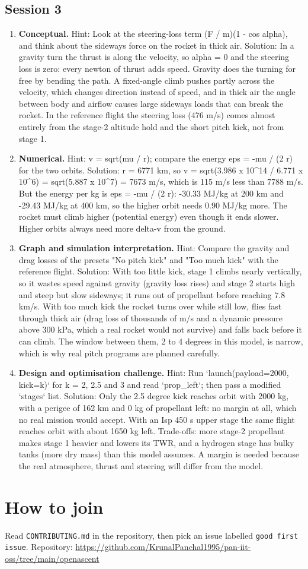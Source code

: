 \documentclass[11pt,a4paper]{article}
\begin{document}
\subsection*{Session 3}
\begin{enumerate}[nosep]
\item \textbf{Conceptual.} Hint: Look at the steering-loss term (F / m)(1 - cos alpha), and think about the sideways force on the rocket in thick air. Solution: In a gravity turn the thrust is along the velocity, so alpha = 0 and the steering loss is zero: every newton of thrust adds speed. Gravity does the turning for free by bending the path. A fixed-angle climb pushes partly across the velocity, which changes direction instead of speed, and in thick air the angle between body and airflow causes large sideways loads that can break the rocket. In the reference flight the steering loss (476 m/s) comes almost entirely from the stage-2 altitude hold and the short pitch kick, not from stage 1.
\item \textbf{Numerical.} Hint: v = sqrt(mu / r); compare the energy eps = -mu / (2 r) for the two orbits. Solution: r = 6771 km, so v = sqrt(3.986 x 10\textasciicircum{}14 / 6.771 x 10\textasciicircum{}6) = sqrt(5.887 x 10\textasciicircum{}7) = 7673 m/s, which is 115 m/s less than 7788 m/s. But the energy per kg is eps = -mu / (2 r): -30.33 MJ/kg at 200 km and -29.43 MJ/kg at 400 km, so the higher orbit needs 0.90 MJ/kg more. The rocket must climb higher (potential energy) even though it ends slower. Higher orbits always need more delta-v from the ground.
\item \textbf{Graph and simulation interpretation.} Hint: Compare the gravity and drag losses of the presets "No pitch kick" and "Too much kick" with the reference flight. Solution: With too little kick, stage 1 climbs nearly vertically, so it wastes speed against gravity (gravity loss rises) and stage 2 starts high and steep but slow sideways; it runs out of propellant before reaching 7.8 km/s. With too much kick the rocket turns over while still low, flies fast through thick air (drag loss of thousands of m/s and a dynamic pressure above 300 kPa, which a real rocket would not survive) and falls back before it can climb. The window between them, 2 to 4 degrees in this model, is narrow, which is why real pitch programs are planned carefully.
\item \textbf{Design and optimisation challenge.} Hint: Run `launch(payload=2000, kick=k)` for k = 2, 2.5 and 3 and read `prop\_left`; then pass a modified `stages` list. Solution: Only the 2.5 degree kick reaches orbit with 2000 kg, with a perigee of 162 km and 0 kg of propellant left: no margin at all, which no real mission would accept. With an Isp 450 s upper stage the same flight reaches orbit with about 1650 kg left. Trade-offs: more stage-2 propellant makes stage 1 heavier and lowers its TWR, and a hydrogen stage has bulky tanks (more dry mass) than this model assumes. A margin is needed because the real atmosphere, thrust and steering will differ from the model.
\end{enumerate}

\section{How to join}
Read \texttt{CONTRIBUTING.md} in the repository, then pick an issue labelled \texttt{good first issue}. Repository: \url{https://github.com/KrunalPanchal1995/pan-iit-oss/tree/main/openascent}
\end{document}
